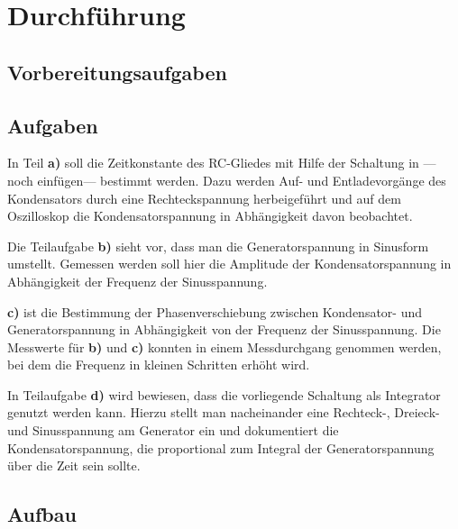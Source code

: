 \section{Durchführung}
\label{sec:Durchfuehrung}

\subsection{Vorbereitungsaufgaben}



\subsection{Aufgaben}
\label{subsec:Aufgaben}

In Teil \textbf{a)} soll die Zeitkonstante des RC-Gliedes mit Hilfe der Schaltung in
---noch einfügen--- bestimmt werden. 
Dazu werden Auf- und Entladevorgänge des Kondensators 
durch eine Rechteckspannung herbeigeführt und auf dem Oszilloskop die Kondensatorspannung in 
Abhängigkeit davon beobachtet.

Die Teilaufgabe \textbf{b)} sieht vor, dass man die Generatorspannung in Sinusform umstellt.
Gemessen werden soll hier die Amplitude der Kondensatorspannung in Abhängigkeit der Frequenz
der Sinusspannung.

\textbf{c)} ist die Bestimmung der Phasenverschiebung zwischen Kondensator- und 
Generatorspannung in Abhängigkeit von der Frequenz der Sinusspannung. Die Messwerte für \textbf{b)} und \textbf{c)} konnten in einem 
Messdurchgang genommen werden, bei dem die Frequenz in kleinen Schritten erhöht wird.

In Teilaufgabe \textbf{d)} wird bewiesen, dass die vorliegende Schaltung als Integrator genutzt werden kann.
Hierzu stellt man nacheinander eine Rechteck-, Dreieck- und Sinusspannung am Generator ein und dokumentiert 
die Kondensatorspannung, die proportional zum Integral der Generatorspannung über die Zeit sein sollte.



\subsection{Aufbau}
\label{subsec:Aufbau}


